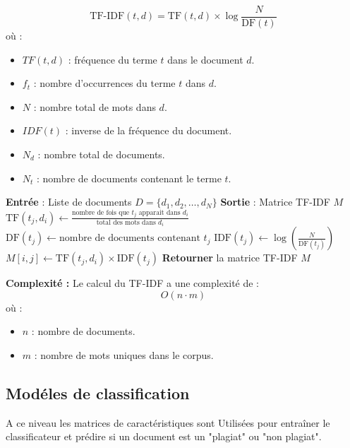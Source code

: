 \[
\text{TF-IDF}(t,d) = \text{TF}(t,d) \times \log \frac{N}{\text{DF}(t)}
\]
où :
\begin{itemize}
    \item \( TF(t, d) \) : fréquence du terme \( t \) dans le document \( d \).
    \item \( f_t \) : nombre d’occurrences du terme \( t \) dans \( d \).
    \item \( N \) : nombre total de mots dans \( d \).
    \item \( IDF(t) \) : inverse de la fréquence du document.
    \item \( N_d \) : nombre total de documents.
    \item \( N_t \) : nombre de documents contenant le terme \( t \).
\end{itemize}
\begin{algorithm}[H]
\caption{Calcul de TF-IDF}
\begin{algorithmic}[1]
\State \textbf{Entrée} : Liste de documents $D = \{d_1, d_2, \dots, d_N\}$
\State \textbf{Sortie} : Matrice TF-IDF $M$
        \State $\text{TF}(t_j, d_i) \gets \frac{\text{nombre de fois que } t_j \text{ apparait dans } d_i}{\text{total des mots dans } d_i}$
        \State $\text{DF}(t_j) \gets \text{nombre de documents contenant } t_j$
        \State $\text{IDF}(t_j) \gets \log \left( \frac{N}{\text{DF}(t_j)} \right)$
        \State $M[i,j] \gets \text{TF}(t_j, d_i) \times \text{IDF}(t_j)$
    \EndFor
\EndFor
\State \textbf{Retourner} la matrice TF-IDF $M$
\end{algorithmic}
\end{algorithm}
\textbf{Complexité :}  
Le calcul du TF-IDF a une complexité de :
\begin{equation}
O(n \cdot m)
\end{equation}
où :
\begin{itemize}
    \item \( n \) : nombre de documents.
    \item \( m \) : nombre de mots uniques dans le corpus.
\end{itemize}

\subsection{Modéles de classification}
A ce niveau les matrices de caractéristiques sont Utilisées pour entraîner le classificateur et prédire si un document est un "plagiat" ou "non plagiat".

